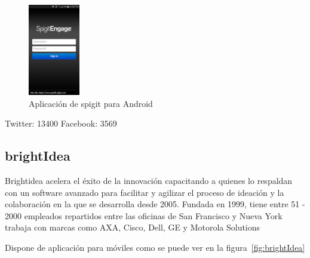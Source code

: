 \begin{figure}[!h]
\begin{center}
		\includegraphics[width=0.2\textwidth]{./img/competencia/spigit/6.png}
		\caption{Aplicación de spigit para Android}
		\label{fig:sipigi}
	\end{center}
\end{figure}

Twitter: 13400
Facebook: 3569 

\subsection{brightIdea}

Brightidea acelera el éxito de la innovación capacitando a quienes lo respaldan con un software avanzado para facilitar 
y agilizar el proceso de ideación y la colaboración en la que se desarrolla desde 2005. Fundada en 1999, tiene entre 51 - 2000 empleados 
repartidos entre las oficinas de San Francisco y Nueva York trabaja con marcas como AXA, Cisco, Dell, GE y Motorola Solutions

Dispone de aplicación para móviles como se puede ver en la figura~\ref{fig:brightIdea}

